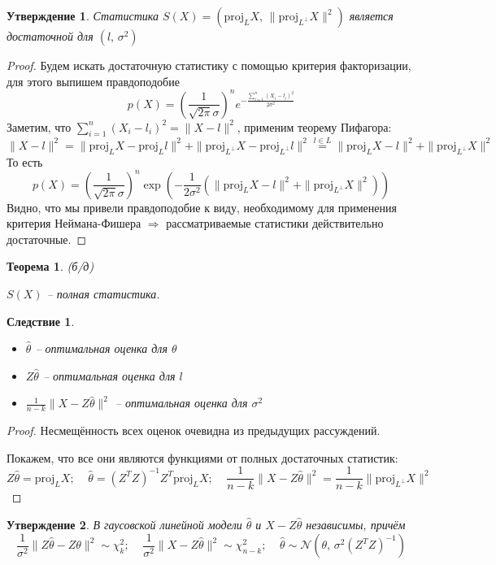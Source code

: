 \documentclass[a4paper,12pt]{article}
\theoremstyle{plain}
\newtheorem{theorem}{Теорема}[section]
\newtheorem{proposition}{Утверждение}[section]
\newtheorem*{corollary}{Следствие}
\theoremstyle{definition}
\theoremstyle{remark}
\begin{document}
\begin{proposition}
  Статистика $S(X) = (\text{proj}_LX,\, \|\text{proj}_{L^\bot}X\|^2)$ является достаточной для $(l,\,\sigma^2)$
\end{proposition}

\begin{proof}
  Будем искать достаточную статистику с помощью критерия факторизации, для этого выпишем правдоподобие
  \[
    p(X) = \left(\frac{1}{\sqrt{2\pi}\sigma}\right)^ne^{-\frac{\sum_{i = 1}^n(X_i - l_i)^2}{2\sigma^2}}
  \]
  Заметим, что $\sum_{i = 1}^n(X_i - l_i)^2 = \|X - l\|^2$, применим теорему Пифагора:
  \[
    \|X - l\|^2 = \|\text{proj}_LX - \text{proj}_Ll\|^2 + \|\text{proj}_{L^\bot}X - \text{proj}_{L^\bot}l\|^2 \overset{l \in L}{=} \|\text{proj}_LX - l\|^2 + \|\text{proj}_{L^\bot}X\|^2
  \]
  То есть
  \[
    p(X) = \left(\frac{1}{\sqrt{2\pi}\sigma}\right)^n\exp\left(-\frac{1}{2\sigma^2}(\|\text{proj}_LX - l\|^2 + \|\text{proj}_{L^\bot}X\|^2)\right)
  \]
  Видно, что мы привели правдоподобие к виду, необходимому для применения критерия Неймана-Фишера $\Rightarrow$ рассматриваемые статистики действительно достаточные.
\end{proof}

\begin{theorem}
  (б/д)
  
  $S(X)$ -- полная статистика. 
\end{theorem}

\begin{corollary}
  \begin{itemize}
    \item $\hat{\theta}$ -- оптимальная оценка для $\theta$
    \item $Z\hat{\theta}$ -- оптимальная оценка для $l$
    \item $\frac{1}{n - k}\|X - Z\hat{\theta}\|^2$ -- оптимальная оценка для $\sigma^2$
  \end{itemize}
\end{corollary}

\begin{proof}
  Несмещённость всех оценок очевидна из предыдущих рассуждений.

  Покажем, что все они являются функциями от полных достаточных статистик:  
  \[
    Z\hat{\theta} = \text{proj}_LX;\;\;\;\; \hat{\theta} = (Z^TZ)^{-1}Z^T\text{proj}_LX;\;\;\;\; \frac{1}{n - k}\|X - Z\hat{\theta}\|^2 = \frac{1}{n - k}\|\text{proj}_{L^\bot}X\|^2
  \]
\end{proof}

\begin{proposition}
  В гаусовской линейной модели $\hat{\theta}$ и $X - Z\hat{\theta}$ независимы, причём
  \[
    \frac{1}{\sigma^2}\|Z\hat{\theta} - Z\theta\|^2 \sim \chi^2_k;\;\;\;\; \frac{1}{\sigma^2}\|X - Z\hat{\theta}\|^2 \sim \chi^2_{n - k};\;\;\;\; \hat{\theta} \sim \mathcal{N}(\theta,\, \sigma^2(Z^TZ)^{-1})
  \]
\end{proposition}
\end{document}
